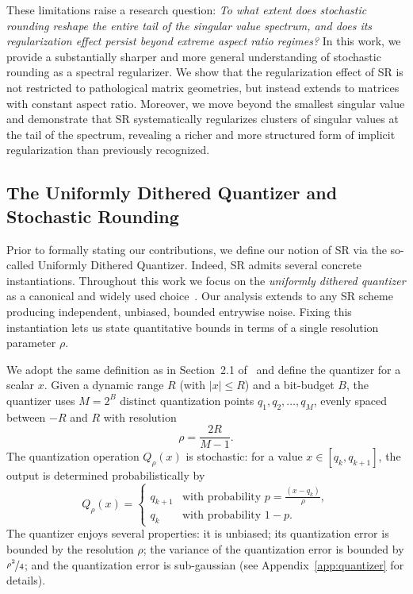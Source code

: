 \documentclass{article}
\begin{document}
These limitations raise a research question: \textit{To what extent does stochastic rounding reshape the entire tail of the singular value spectrum, and does its regularization effect persist beyond extreme aspect ratio regimes?} In this work, we provide a substantially sharper and more general understanding of stochastic rounding as a spectral regularizer. We show that the regularization effect of SR is not restricted to pathological matrix geometries, but instead extends to matrices with constant aspect ratio. Moreover, we move beyond the smallest singular value and demonstrate that SR systematically regularizes clusters of singular values at the tail of the spectrum, revealing a richer and more structured form of implicit regularization than previously recognized.

\subsection{The Uniformly Dithered Quantizer and Stochastic Rounding}\label{sec:intro_quantizer}

Prior to formally stating our contributions, we define our notion of SR via the so-called Uniformly Dithered Quantizer. Indeed, SR admits several concrete instantiations. Throughout this work we focus on the \emph{uniformly dithered quantizer} as a canonical and widely used choice~\citep{saha2023matrix}. Our analysis extends to any SR scheme producing independent, unbiased, bounded entrywise noise. Fixing this instantiation lets us state quantitative bounds in terms of a single resolution parameter $\rho$.

We adopt the same definition as in Section~2.1 of~\citep{saha2023matrix} and define the quantizer for a scalar $x$. Given a dynamic range $R$ (with $|x| \le R$) and a bit-budget $B$, the quantizer uses $M = 2^B$ distinct quantization points $q_1, q_2, \ldots, q_M$, evenly spaced between $-R$ and $R$ with resolution 
%
\begin{equation}\label{eqn:pd1}
\rho = \frac{2R}{M-1}.   
\end{equation}
%
The quantization operation $Q_{\rho}(x)$ is stochastic: for a value $x \in [q_k, q_{k+1}]$, the output is determined probabilistically by
\begin{equation}\label{eqn:Q_rho}
    Q_{\rho}(x) =
    \begin{cases}
        q_{k+1} & \text{with probability } p = \frac{(x-q_k)}{\rho}, \\
        q_k     & \text{with probability } 1-p.
    \end{cases}
\end{equation}
%
The quantizer enjoys several properties: it is unbiased; its quantization error is bounded by the resolution $\rho$; the variance of the quantization error is bounded by $\nicefrac{\rho^2}{4}$; and the quantization error is sub-gaussian (see Appendix~\ref{app:quantizer} for details).
\end{document}

